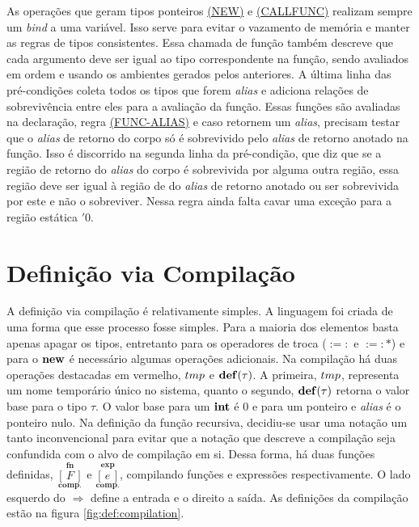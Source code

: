 As operações que geram tipos ponteiros \hyperref[trule:new]{(NEW)} e \hyperref[trule:callfunc]{(CALLFUNC)} realizam sempre um \emph{bind} a uma variável. Isso serve para evitar o vazamento de memória e manter as regras de tipos consistentes. Essa chamada de função também descreve que cada argumento deve ser igual ao tipo correspondente na função, sendo avaliados em ordem e usando os ambientes gerados pelos anteriores. A última linha das pré-condições coleta todos os tipos que forem \emph{alias} e adiciona relações de sobrevivência entre eles para a avaliação da função. Essas funções são avaliadas na declaração, regra \hyperref[trule:func-alias]{(FUNC-ALIAS)} e caso retornem um \emph{alias}, precisam testar que o \emph{alias} de retorno do corpo só é sobrevivido pelo \emph{alias} de retorno anotado na função. Isso é discorrido na segunda linha da pré-condição, que diz que se a região de retorno do \emph{alias} do corpo é sobrevivida por alguma outra região, essa região deve ser igual à região de do \emph{alias} de retorno anotado ou ser sobrevivida por este e não o sobreviver. Nessa regra ainda falta cavar uma exceção para a região estática $'0$.

\section{Definição via Compilação}
\label{chap5:compile}

\newcommand{\compf}[1]{\overset{\mathbf{fn}}{\underset{\mathbf{comp.}}{[\,#1\,]}}}
\newcommand{\compe}[1]{\overset{\mathbf{exp}}{\underset{\mathbf{comp.}}{[\,#1\,]}}}
\newcommand{\TMP}{{\color{red}tmp}}
\newcommand{\DEF}{{\color{red}\mathbf{def}({\color{black}\tau})}}

A definição via compilação é relativamente simples. A linguagem foi criada de uma forma que esse processo fosse simples. Para a maioria dos elementos basta apenas apagar os tipos, entretanto para os operadores de troca ($:=:$ e $:=:\!\!\text{*}$) e para o $\mathbf{new}$ é necessário algumas operações adicionais. Na compilação há duas operações destacadas em vermelho, $\TMP$ e $\DEF$. A primeira, $\TMP$, representa um nome temporário único no sistema, quanto o segundo, $\DEF$ retorna o valor base para o tipo $\tau$. O valor base para um $\mathbf{int}$ é 0 e para um ponteiro e \emph{alias} é o ponteiro nulo. Na definição da função recursiva, decidiu-se usar uma notação um tanto inconvencional para evitar que a notação que descreve a compilação seja confundida com o alvo de compilação em si. Dessa forma, há duas funções definidas, $\compf{F}$ e $\compe{e}$, compilando funções e expressões respectivamente. O lado esquerdo do $\Rightarrow$ define a entrada e o direito a saída. As definições da compilação estão na figura \ref{fig:def:compilation}.

